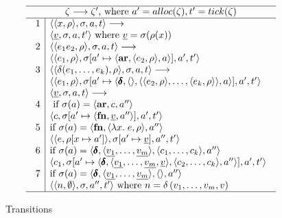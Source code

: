 \RequirePackage[hyphens]{url}\documentclass[12pt,oneside]{amsart}
\newcommand{\kw}[1]{\mathbf{#1}}
\newcommand{\lmd}[2]{\lambda #1.\;#2}
\begin{document}
\begin{figure}[hbpt]
\[\begin{array}{c}\hline
\zeta \longrightarrow \zeta^\prime\text{, where } a^\prime = alloc(\zeta),
    t^\prime = tick(\zeta) \\ \hline
\begin{array}{c|l}
    1 & \langle\langle x, \rho\rangle, \sigma, a, t\rangle \longrightarrow \\ &
        \langle\underline{v}, \sigma, a, t^\prime\rangle \text{ where $\underline{v} = \sigma(\rho(x))$} \\
    2 & \langle\langle e_1e_2, \rho\rangle, \sigma, a, t\rangle \longrightarrow \\ &
        \langle\langle e_1, \rho\rangle, \sigma[a^\prime\mapsto\langle\kw{ar}, \langle e_2, \rho\rangle, a\rangle], a^\prime, t^\prime\rangle \\
    3 & \langle\langle\delta(e_1,\ldots,e_k),\rho\rangle, \sigma, a, t\rangle
        \longrightarrow \\ & \langle\langle e_1, \rho\rangle, \sigma[a^\prime\mapsto\langle\pmb{\delta}, \langle\rangle, \langle\langle e_2, \rho\rangle, \ldots, \langle e_k, \rho\rangle\rangle, a\rangle], a^\prime, t^\prime\rangle \\
    & \langle\underline{v}, \sigma, a, t\rangle \longrightarrow \\
    4 & \text{ if $\sigma(a) = \langle\kw{ar}, c, a^{\prime\prime}\rangle$} \\ &
        \langle c, \sigma[a^\prime\mapsto\langle\kw{fn}, \underline{v}, a^{\prime\prime}\rangle], a^\prime, t^\prime\rangle \\
    5 & \text{if $\sigma(a) = \langle\kw{fn}, \langle\lmd{x}{e}, \rho\rangle,
        a^{\prime\prime}\rangle$} \\ & \langle\langle e, \rho[x\mapsto a^\prime]\rangle, \sigma[a^\prime\mapsto \underline{v}], a^{\prime\prime}, t^\prime\rangle \\
    6 & \text{if $\sigma(a) = \langle\pmb{\delta}, \langle\underline{v_1}, \ldots,
        \underline{v_m}\rangle, \langle c_1, \ldots, c_k\rangle, a^{\prime\prime}\rangle$} \\ & \langle c_1, \sigma[a^\prime\mapsto\langle\pmb{\delta}, \langle \underline{v_1}, \ldots, \underline{v_m}, \underline{v}\rangle, \langle c_2,\ldots,c_k\rangle,a^{\prime\prime}\rangle],a^\prime,t^\prime\rangle \\
    7 & \text{if $\sigma(a) = \langle\pmb{\delta}, \langle\underline{v_1}, \ldots, \underline{v_m}\rangle, \langle\rangle, a^{\prime\prime}\rangle$} \\ &
        \langle\langle n, \emptyset\rangle, \sigma, a^{\prime\prime}, t^\prime\rangle \text{ where $n = \delta\left(v_1,\ldots,v_m,v\right)$} \\
\end{array} \\ \hline \end{array}\]
\caption{Transitions}
\label{fig:transitions}
\end{figure}
\end{document}
